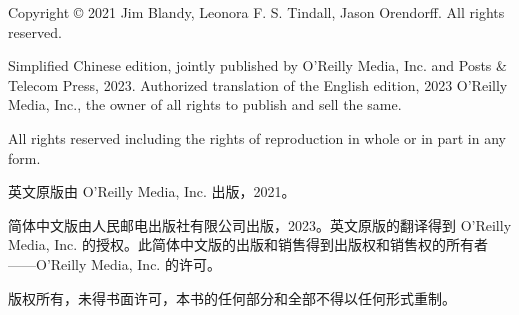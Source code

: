 
Copyright © 2021 Jim Blandy, Leonora F. S. Tindall, Jason Orendorff. All rights reserved.

Simplified Chinese edition, jointly published by O'Reilly Media, Inc. and Posts \& Telecom Press, 2023. Authorized translation of the English edition, 2023 O'Reilly Media, Inc., the owner of all rights to publish and sell the same.

All rights reserved including the rights of reproduction in whole or in part in any form.

英文原版由 O'Reilly Media, Inc. 出版，2021。

简体中文版由人民邮电出版社有限公司出版，2023。英文原版的翻译得到 O'Reilly Media, Inc. 的授权。此简体中文版的出版和销售得到出版权和销售权的所有者——O'Reilly Media, Inc. 的许可。

版权所有，未得书面许可，本书的任何部分和全部不得以任何形式重制。

